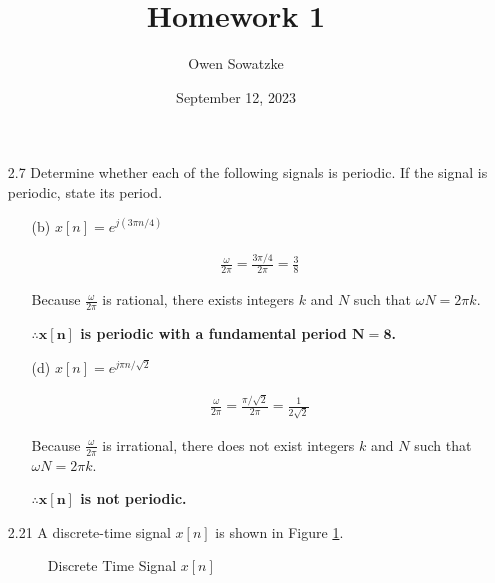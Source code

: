 \documentclass[fleqn]{article}
\title{Homework 1}
\author{Owen Sowatzke}
\date{September 12, 2023}
\begin{document}
	\setlength{\abovedisplayskip}{0pt}
	\setlength{\belowdisplayskip}{0pt}
	\setlength{\abovedisplayshortskip}{0pt}
	\setlength{\belowdisplayshortskip}{0pt}
	\setlength{\mathindent}{0pt}
	\doublespacing
	\maketitle
	
	\begin{enumerate}[nolistsep]
	
		\item[2.7] Determine whether each of the following signals is periodic. If the signal is periodic, state its period.
		
		\begin{enumerate}[nolistsep]
			
			\item[(b)] $x[n] = e^{j({3\pi}n/4)}$
			
			\begin{align*}
			\frac{\omega}{2\pi} = \frac{3\pi/4}{2\pi} = \frac{3}{8}
			\end{align*}
			
			Because $\frac{\omega}{2\pi}$ is rational, there exists integers $k$ and $N$ such that ${\omega}N = 2{\pi}k$.
			
			\textbf{$\mathbf{\therefore x[n]}$ is periodic with a fundamental period $\mathbf{N = 8}$.}
			
			\item[(d)] $x[n] = e^{j{\pi}n/\sqrt{2}}$
			
			\begin{align*}
			\frac{\omega}{2\pi} = \frac{\pi/\sqrt{2}}{2\pi} = \frac{1}{2\sqrt{2}}
			\end{align*}
			
			Because $\frac{\omega}{2\pi}$ is irrational, there does not exist integers $k$ and $N$ such that ${\omega}N = 2{\pi}k$.
			
			\textbf{$\mathbf{\therefore x[n]}$ is not periodic.}
			
		\end{enumerate}\break
		\item[2.21] A discrete-time signal $x[n]$ is shown in Figure \ref{prob_statement}.
		
	
		\begin{figure}[H]		\centerline{}
		\caption{Discrete Time Signal $x[n]$}
		\label{prob_statement}
		\end{figure}
		

\end{enumerate}
\end{document}
